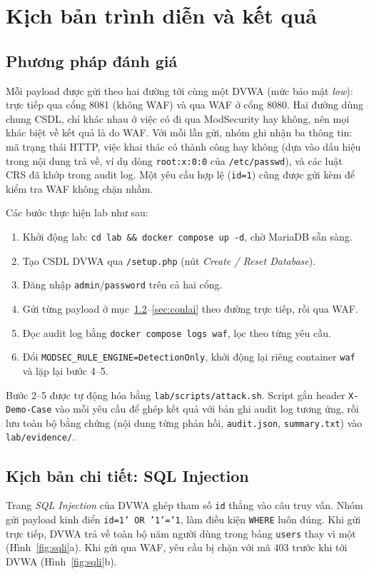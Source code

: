 \chapter{Kịch bản trình diễn và kết quả}\label{chap:demo}

\section{Phương pháp đánh giá}
Mỗi payload được gửi theo hai đường tới cùng một DVWA (mức bảo mật \textit{low}): trực tiếp qua cổng 8081 (không WAF) và qua WAF ở cổng 8080. Hai đường dùng chung CSDL, chỉ khác nhau ở việc có đi qua ModSecurity hay không, nên mọi khác biệt về kết quả là do WAF. Với mỗi lần gửi, nhóm ghi nhận ba thông tin: mã trạng thái HTTP, việc khai thác có thành công hay không (dựa vào dấu hiệu trong nội dung trả về, ví dụ dòng \texttt{root:x:0:0} của \texttt{/etc/passwd}), và các luật CRS đã khớp trong audit log. Một yêu cầu hợp lệ (\texttt{id=1}) cũng được gửi kèm để kiểm tra WAF không chặn nhầm.

Các bước thực hiện lab như sau:
\begin{enumerate}
\item Khởi động lab: \texttt{cd lab \&\& docker compose up -d}, chờ MariaDB sẵn sàng.
\item Tạo CSDL DVWA qua \texttt{/setup.php} (nút \textit{Create / Reset Database}).
\item Đăng nhập \texttt{admin}/\texttt{password} trên cả hai cổng.
\item Gửi từng payload ở mục~\ref{sec:sqli}--\ref{sec:conlai} theo đường trực tiếp, rồi qua WAF.
\item Đọc audit log bằng \texttt{docker compose logs waf}, lọc theo từng yêu cầu.
\item Đổi \texttt{MODSEC\_RULE\_ENGINE=DetectionOnly}, khởi động lại riêng container \texttt{waf} và lặp lại bước 4--5.
\end{enumerate}
Bước 2--5 được tự động hóa bằng \texttt{lab/scripts/attack.sh}. Script gắn header \texttt{X-Demo-Case} vào mỗi yêu cầu để ghép kết quả với bản ghi audit log tương ứng, rồi lưu toàn bộ bằng chứng (nội dung từng phản hồi, \texttt{audit.json}, \texttt{summary.txt}) vào \texttt{lab/evidence/}.

\section{Kịch bản chi tiết: SQL Injection}\label{sec:sqli}
Trang \textit{SQL Injection} của DVWA ghép tham số \texttt{id} thẳng vào câu truy vấn. Nhóm gửi payload kinh điển \texttt{id=1' OR '1'='1}, làm điều kiện \texttt{WHERE} luôn đúng. Khi gửi trực tiếp, DVWA trả về toàn bộ năm người dùng trong bảng \texttt{users} thay vì một (Hình~\ref{fig:sqli}a). Khi gửi qua WAF, yêu cầu bị chặn với mã 403 trước khi tới DVWA (Hình~\ref{fig:sqli}b).

